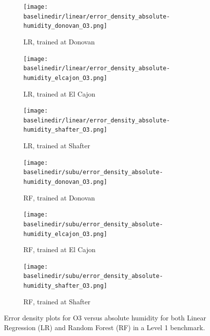 \documentclass[journal abbreviation, manuscript]{copernicus}
\begin{document}

\begin{figure}[H]
\centering
\begin{subfigure}{0.33\textwidth}
\texttt{[image: \\baselinedir/linear/error\_density\_absolute-humidity\_donovan\_O3.png]}
\caption{LR, trained at Donovan}
\end{subfigure}
\begin{subfigure}{0.33\textwidth}
\texttt{[image: \\baselinedir/linear/error\_density\_absolute-humidity\_elcajon\_O3.png]}
\caption{LR, trained at El Cajon}
\end{subfigure}
\begin{subfigure}{0.33\textwidth}
\texttt{[image: \\baselinedir/linear/error\_density\_absolute-humidity\_shafter\_O3.png]}
\caption{LR, trained at Shafter}
\end{subfigure}
\begin{subfigure}{0.33\textwidth}
\texttt{[image: \\baselinedir/subu/error\_density\_absolute-humidity\_donovan\_O3.png]}
\caption{RF, trained at Donovan}
\end{subfigure}
\begin{subfigure}{0.33\textwidth}
\texttt{[image: \\baselinedir/subu/error\_density\_absolute-humidity\_elcajon\_O3.png]}
\caption{RF, trained at El Cajon}
\end{subfigure}
\begin{subfigure}{0.33\textwidth}
\texttt{[image: \\baselinedir/subu/error\_density\_absolute-humidity\_shafter\_O3.png]}
\caption{RF, trained at Shafter}
\end{subfigure}
\caption{Error density plots for O3 versus absolute humidity for both Linear Regression (LR) and Random Forest (RF) in a Level 1 benchmark.}
\label{fig:error-density}
\end{figure}
\end{document}
